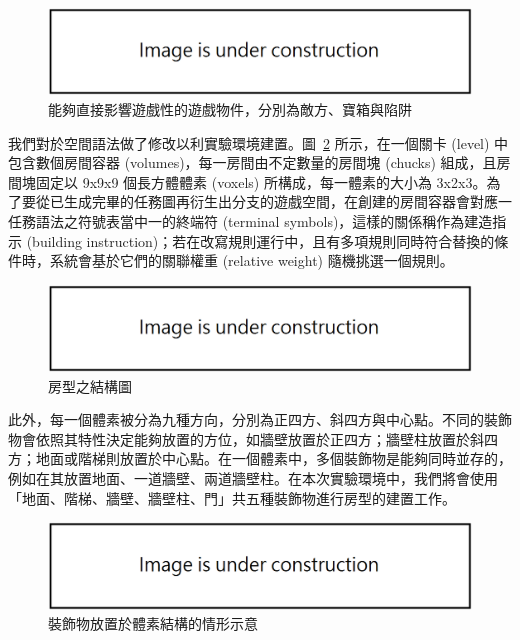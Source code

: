 \begin{figure}[h]
  \begin{center}
    \includegraphics[width=1.0\textwidth]{figures/under_construction.png}
    \caption{能夠直接影響遊戲性的遊戲物件，分別為敵方、寶箱與陷阱} 
    \label{fig:gameobject-list}
  \end{center}
\end{figure}

我們對於空間語法做了修改以利實驗環境建置。圖~\ref{fig:spacepieces-structure} 所示，在一個關卡 (level) 中包含數個房間容器 (volumes)，每一房間由不定數量的房間塊 (chucks) 組成，且房間塊固定以 9x9x9 個長方體體素 (voxels) 所構成，每一體素的大小為 3x2x3。為了要從已生成完畢的任務圖再衍生出分支的遊戲空間，在創建的房間容器會對應一任務語法之符號表當中一的終端符 (terminal symbols)，這樣的關係稱作為建造指示 (building instruction)；若在改寫規則運行中，且有多項規則同時符合替換的條件時，系統會基於它們的關聯權重 (relative weight) 隨機挑選一個規則。

\begin{figure}[h]
  \begin{center}
    \includegraphics[width=1.0\textwidth]{figures/under_construction.png}
    \caption{房型之結構圖} 
    \label{fig:spacepieces-structure}
  \end{center}
\end{figure}

此外，每一個體素被分為九種方向，分別為正四方、斜四方與中心點。不同的裝飾物會依照其特性決定能夠放置的方位，如牆壁放置於正四方；牆壁柱放置於斜四方；地面或階梯則放置於中心點。在一個體素中，多個裝飾物是能夠同時並存的，例如在其放置地面、一道牆壁、兩道牆壁柱。在本次實驗環境中，我們將會使用「地面、階梯、牆壁、牆壁柱、門」共五種裝飾物進行房型的建置工作。

\begin{figure}[h]
  \begin{center}
    \includegraphics[width=1.0\textwidth]{figures/under_construction.png}
    \caption{裝飾物放置於體素結構的情形示意} 
    \label{fig:decorations-with-directions}
  \end{center}
\end{figure}

